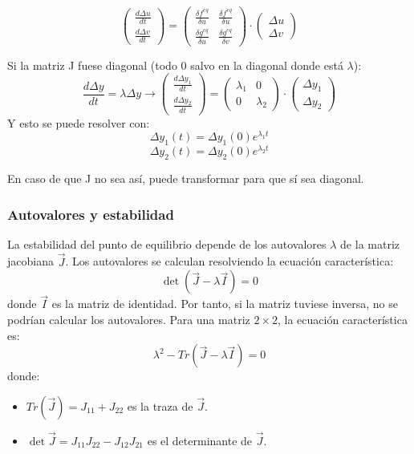 $$\begin{pmatrix}
\frac{d \Delta u}{dt} \\ \frac{d \Delta v}{dt}
\end{pmatrix} = \begin{pmatrix}
\frac{\delta f^{eq}}{\delta u} & \frac{\delta f^{eq}}{\delta u} \\
\frac{\delta g^{eq}}{\delta u} & \frac{\delta g^{eq}}{\delta v}
\end{pmatrix} \cdot \begin{pmatrix}
\Delta u \\ \Delta v
\end{pmatrix}$$

Si la matriz J fuese diagonal (todo 0 salvo en la diagonal donde está $\lambda$):
$$\frac{d \Delta y}{dt} = \lambda \Delta y \rightarrow \begin{pmatrix}
\frac{d \Delta y_1}{dt} \\ \frac{d \Delta y_2}{dt}
\end{pmatrix} = \begin{pmatrix}
\lambda_1 & 0 \\ 0 & \lambda_2
\end{pmatrix} \cdot \begin{pmatrix}
\Delta y_1 \\ \Delta y_2
\end{pmatrix}$$
Y esto se puede resolver con:
$$\Delta y_1 (t) = \Delta y_1 (0) e^{\lambda_1 t}$$
$$\Delta y_2 (t) = \Delta y_2 (0) e^{\lambda_2 t}$$

En caso de que J no sea así, puede transformar para que sí sea diagonal.

\subsubsection{Autovalores y estabilidad}
La estabilidad del punto de equilibrio depende de los autovalores $\lambda$ de la matriz jacobiana $\vec{J}$. Los autovalores se calculan resolviendo la ecuación característica:
$$\det (\vec{J} - \lambda \vec{I}) = 0$$
donde $\vec{I}$ es la matriz de identidad. Por tanto, si la matriz tuviese inversa, no se podrían calcular los autovalores.
Para una matriz $2 \times 2$, la ecuación característica es:
$$\lambda^2 - Tr(\vec{J} - \lambda \vec{I}) = 0$$
donde:
\begin{itemize}
\item $Tr(\vec{J}) = J_{11} + J_{22}$ es la traza de $\vec{J}$.
\item $\det \vec{J} = J_{11}J_{22} - J_{12}J_{21}$ es el determinante de $\vec{J}$. 
\end{itemize}

